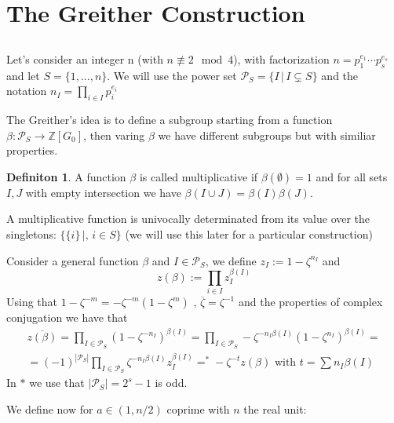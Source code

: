 \documentclass[]{article}
\theoremstyle{plain}
\theoremstyle{remark}
\theoremstyle{definition}
\newtheorem{deff}[teo]{Definiton}
\newcommand{\PS}{\mathcal{P}_S}
\newcommand{\Z}{\mathbb{Z}}
\DeclareMathOperator*{\eqb }{=}
\begin{document}
\section{The Greither Construction}

	\subsection*{}
	Let's consider an integer n (with $n \not \equiv 2 \mod 4$), with factorization $ n= p_1 ^{e_1} \cdots p_s ^{e_s} $ and let $ S = \{1, ... , n \}$. We will use the power set $ \PS = \{ I \,|\, I \subsetneq S\}$ and the notation $ n_I = \prod_{i \in I} p_i ^{e_i} $ 
	
	The Greither's idea is to define a subgroup starting from a function $ \beta : \PS \to \Z[G_0] $, then varing $\beta$ we have different subgroups but with similiar properties. 
	
	\begin{deff}
		A function $\beta$ is called multiplicative if $ \beta (\emptyset) = 1 $ and for all sets $ I,J $ with empty intersection we have $ \beta (I\cup J) = \beta(I) \beta(J)$.
	\end{deff}

	A multiplicative function is univocally determinated from its value over the singletons: $ \{\{i\} \,|,\, i \in S\} $ (we will use this later for a particular construction)

	Consider a general function $\beta$ and $ I \in \PS $, we define $ z_I  := 1 - \zeta ^{n_I}$ and 
	$$ z(\beta ):= \prod_{i\in I} z_I ^{\beta(I)} $$ 
	Using that $ 1 - \zeta ^{-m} = -\zeta^{-m} ( 1 - \zeta ^m ) $ , $ \overline{ \zeta} = \zeta ^{-1}  $ and the properties of complex conjugation we have that 
	\begin{multline}\label{eq:zbetacon}
		\overline{z(\beta )} = \prod_{I \in \PS} ({1 - \zeta ^{-n_I}})^{\beta(I)}  = \prod_{I \in \PS} - \zeta ^{-n_I \beta(I)} (1 - \zeta ^{n_I})^{\beta (I)} =\\
		=(-1)^{|\PS|}\prod_{I \in \PS} \zeta ^{-n_I \beta(I)} z_I^{\beta (I)} \eqb^\ast - \zeta^{-t} z(\beta) \text{ with } t = \sum n_I \beta(I)
	\end{multline}
	In $\ast$ we use that $ |\PS| = 2^s -1 $ is odd. 
	
	We define now for $ a \in (1 , n/2)$ coprime with $ n $ the real unit:
\end{document}

